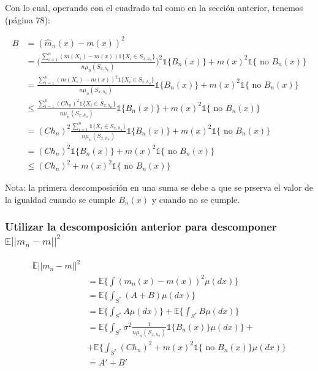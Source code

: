 \documentclass[12pt, a4paper]{article}
\begin{document}
Con lo cual, operando con el cuadrado tal como en la sección anterior, tenemos (página 78):

$$
\begin{aligned}
  B 
  &= (\hat{m}_n(x)-m(x))^2 \\
  &=  \Bigg( \frac{ \sum_{i=1}^{n} (m(X_i) - m(x)) \mathds{1}\{ X_i \in S_{x,h_n} \} }{n \mu_n(S_{x,h_n})} \Bigg)^2 \mathds{1}\{ B_n(x) \} + m(x)^2 \mathds{1}\{ \text{ no } B_n(x) \} \\
  &=   \frac{ \sum_{i=1}^{n} (m(X_i) - m(x))^2 \mathds{1}\{ X_i \in S_{x,h_n} \} }{n \mu_n(S_{x,h_n})}  \mathds{1}\{ B_n(x) \} + m(x)^2 \mathds{1}\{ \text{ no } B_n(x) \} \\
  &\leq   \frac{ \sum_{i=1}^{n} (C h_n)^2 \mathds{1}\{ X_i \in S_{x,h_n} \} }{n \mu_n(S_{x,h_n})}  \mathds{1}\{ B_n(x) \} + m(x)^2 \mathds{1}\{ \text{ no } B_n(x) \} \\
  &= (C h_n)^2  \frac{ \sum_{i=1}^{n}  \mathds{1}\{ X_i \in S_{x,h_n} \} }{n \mu_n(S_{x,h_n})}  \mathds{1}\{ B_n(x) \} + m(x)^2 \mathds{1}\{ \text{ no } B_n(x) \} \\
  &= (C h_n)^2    \mathds{1}\{ B_n(x) \} + m(x)^2 \mathds{1}\{ \text{ no } B_n(x) \} \\
  &\leq (C h_n)^2 + m(x)^2 \mathds{1}\{ \text{ no } B_n(x) \}
\end{aligned}
$$

Nota: la primera descomposición en una suma se debe a que se prserva el valor de la igualdad cuando se cumple $B_n(x)$ y cuando no se cumple.

\subsubsection{Utilizar la descomposición anterior para descomponer $\mathds{E}|| m_n -m ||^2$}

$$
\begin{aligned}
  \mathds{E}|| m_n -m ||^2 \\
  &= \mathds{E} \Bigg\{ \int (m_n(x)-m(x))^2 \mu(dx) 
  \Bigg\} \\
  &= \mathds{E} \Bigg\{ \int_{S^{*}} (A+B) \mu(dx) 
  \Bigg\} \\
  &= \mathds{E} \Bigg\{ \int_{S^{*}} A \mu(dx) 
  \Bigg\} + \mathds{E} \Bigg\{ \int_{S^{*}} B \mu(dx) 
  \Bigg\} \\
  &= \mathds{E} \Bigg\{ \int_{S^{*}} 
      \sigma^2 \frac{ 1 }{n \mu_n(S_{x,h_n})} \mathds{1} \{ B_n(x)\}
   \mu(dx) \Bigg\} 
    + \\ &+ 
   \mathds{E} \Bigg\{ \int_{S^{*}} 
    (C h_n)^2 + m(x)^2 \mathds{1}\{ \text{ no } B_n(x) \}
   \mu(dx) 
  \Bigg\} \\
  &= A' + B'
\end{aligned}
$$
\end{document}
